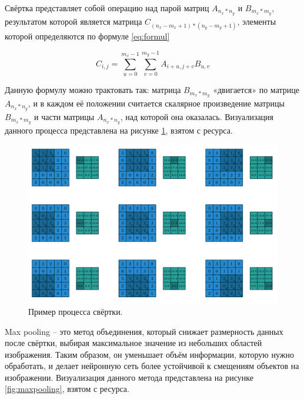\documentclass[14pt, russian]{scrartcl}
\begin{document}
Свёртка представляет собой операцию над парой матриц $A_{n_x*n_y}$ и $B_{m_x*m_y}$, результатом которой является матрица $C_{(n_x-m_x+1)*(n_y-m_y+1)}$, элементы которой определяются по формуле \ref{eq:formul}

\begin{equation}\label{eq:formul}
	C_{i,j} = \sum_{u=0}^{m_x-1} \sum_{v=0}^{m_y-1} A_{i+u,j+v} B_{u,v}
\end{equation}

Данную формулу можно трактовать так: матрица $B_{m_x*m_y}$ «двигается» по матрице $A_{n_x*n_y}$, и в каждом её положении считается скалярное произведение матрицы $B_{m_x*m_y}$ и части матрицы $A_{n_x*n_y}$, над которой она оказалась. Визуализация данного процесса представлена на рисунке \ref{fig:svertka}, взятом с ресурса\cite{itmo}.

\begin{figure}[H]
	\centering
	\begin{minipage}[t]{.5\textwidth}
		\centering
		\includegraphics[width=\linewidth]{./img/svertka.png}
	\end{minipage}
	\caption{Пример процесса свёртки.}
	\label{fig:svertka}
\end{figure}

Max pooling -- это метод объединения, который снижает размерность данных после свёртки, выбирая максимальное значение из небольших областей изображения. Таким образом, он уменьшает объём информации, которую нужно обработать, и делает нейронную сеть более устойчивой к смещениям объектов на изображении. Визуализация данного метода представлена на рисунке \ref{fig:maxpooling}, взятом с ресурса\cite{itmo}.
\end{document}
